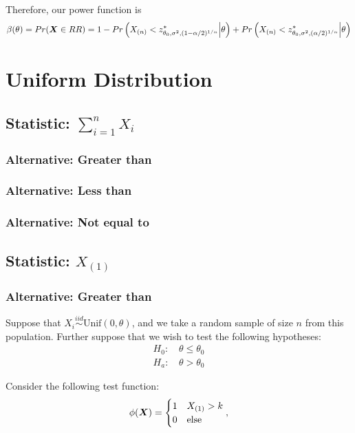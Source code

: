 \documentclass[]{article}
\newcommand{\bfX}{\mbox{\boldmath $X$}}
\begin{document}
Therefore, our power function is
\[
\beta(\theta) = Pr(\bfX \in RR) = 1 - Pr\left(X_{(n)} < z^*_{\theta_0, \sigma^2, (1 - \alpha/2)^{1/n}} \Big| \theta\right) + Pr\left(X_{(n)} < z^*_{\theta_0, \sigma^2, (\alpha/2)^{1/n}} \Big| \theta\right)
\]

\section{Uniform Distribution}

\subsection{Statistic: $\sum_{i=1}^n X_i$}

\subsubsection{Alternative: Greater than}

\subsubsection{Alternative: Less than}

\subsubsection{Alternative: Not equal to}

\subsection{Statistic: $X_{(1)}$}

\subsubsection{Alternative: Greater than}

Suppose that $X_i \stackrel{iid}{\sim} \text{Unif}(0, \theta)$, and we take a random sample of size $n$ from this population. Further suppose that we wish to test the following hypotheses:
\[
\begin{split}
\text{$H_0$: }& \theta \leq \theta_0 \\
\text{$H_a$: }& \theta > \theta_0
\end{split}
\]

Consider the following test function:
\[
\phi(\bfX) = \begin{cases}
1 & X_{(1)} > k \\
0 & \text{else}
\end{cases},
\]
\end{document}

